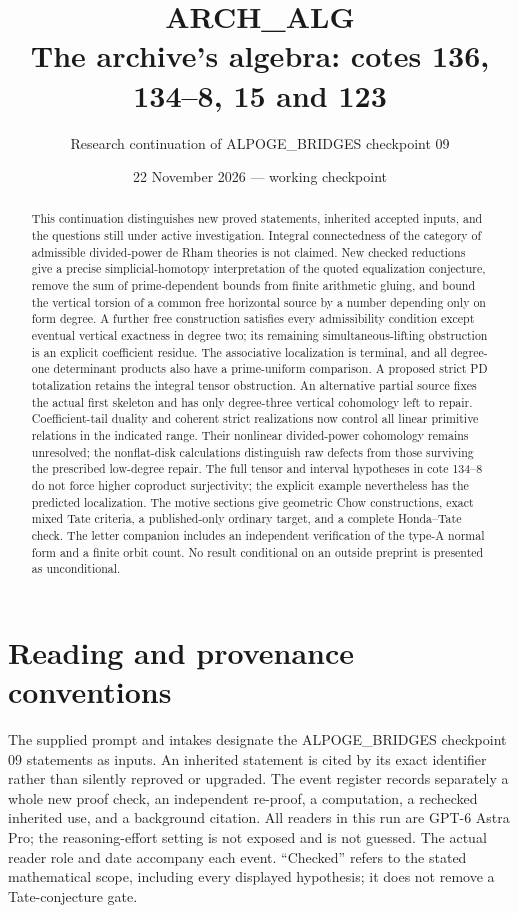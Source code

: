 \documentclass[11pt,a4paper]{article}
\title{ARCH\_ALG\\The archive's algebra: cotes 136, 134--8, 15 and 123}
\author{Research continuation of ALPOGE\_BRIDGES checkpoint 09}
\date{22 November 2026 --- working checkpoint}
\begin{document}
\maketitle
\begin{abstract}
This continuation distinguishes new proved statements, inherited accepted
inputs, and the questions still under active investigation. Integral
connectedness of the category of admissible divided-power de Rham theories
is not claimed. New checked reductions give a precise simplicial-homotopy
interpretation of the quoted equalization conjecture, remove the sum of
prime-dependent bounds from finite arithmetic gluing, and bound the
vertical torsion of a common free horizontal source by a number depending
only on form degree. A further free construction satisfies every
admissibility condition except eventual vertical exactness in degree two;
its remaining simultaneous-lifting obstruction is an explicit coefficient
residue. The associative localization is terminal, and all degree-one
determinant products also have a prime-uniform comparison. A proposed
strict PD totalization retains the integral tensor obstruction.
An alternative partial source fixes the actual first skeleton and has
only degree-three vertical cohomology left to repair. Coefficient-tail
duality and coherent strict realizations now control all linear
primitive relations in the indicated range. Their nonlinear divided-power
cohomology remains unresolved; the nonflat-disk calculations distinguish
raw defects from those surviving the prescribed low-degree repair.
The full tensor and interval hypotheses in cote
134--8 do not force higher coproduct surjectivity; the explicit example
nevertheless has the predicted localization. The motive sections give
geometric Chow constructions, exact mixed Tate criteria, a published-only
ordinary target, and a complete Honda--Tate check. The letter companion
includes an independent verification of the type-A normal form and a
finite orbit count. No result conditional on an outside preprint is
presented as unconditional.
\end{abstract}
\tableofcontents
\clearpage
\section*{Reading and provenance conventions}
The supplied prompt and intakes designate the ALPOGE\_BRIDGES checkpoint
09 statements as inputs. An inherited statement is cited by its exact
identifier rather than silently reproved or upgraded. The event register
records separately a whole new proof check, an independent re-proof, a
computation, a rechecked inherited use, and a background citation. All
readers in this run are GPT-6 Astra Pro; the reasoning-effort setting is
not exposed and is not guessed. The actual reader role and date accompany
each event. ``Checked'' refers to the stated mathematical scope, including
every displayed hypothesis; it does not remove a Tate-conjecture gate.
\end{document}
